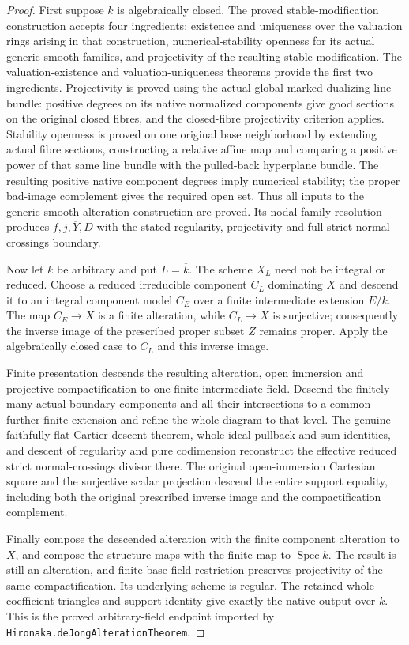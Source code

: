\begin{proof}
First suppose $k$ is algebraically closed. The proved stable-modification
construction accepts four ingredients: existence and uniqueness over the
valuation rings arising in that construction, numerical-stability openness
for its actual generic-smooth families, and projectivity of the resulting
stable modification. The valuation-existence and valuation-uniqueness
theorems provide the first two ingredients. Projectivity is proved using
the actual global marked dualizing line bundle: positive degrees on its
native normalized components give good sections on the original closed
fibres, and the closed-fibre projectivity criterion applies. Stability
openness is proved on one original base neighborhood by extending actual
fibre sections, constructing a relative affine map and comparing a
positive power of that same line bundle with the pulled-back hyperplane
bundle. The resulting positive native component degrees imply numerical
stability; the proper bad-image complement gives the required open set.
Thus all inputs to the generic-smooth alteration construction are proved.
Its nodal-family resolution produces $f,j,\overline Y,D$ with the stated
regularity, projectivity and full strict normal-crossings boundary.

Now let $k$ be arbitrary and put $L=\overline k$. The scheme $X_L$ need
not be integral or reduced. Choose a reduced irreducible component $C_L$
dominating $X$ and descend it to an integral component model $C_E$
over a finite intermediate extension $E/k$. The map $C_E\to X$ is a
finite alteration, while $C_L\to X$ is surjective; consequently the
inverse image of the prescribed proper subset $Z$ remains proper.
Apply the algebraically closed case to $C_L$ and this inverse image.

Finite presentation descends the resulting alteration, open immersion
and projective compactification to one finite intermediate field. Descend
the finitely many actual boundary components and all their intersections
to a common further finite extension and refine the whole diagram to
that level. The genuine faithfully-flat Cartier descent theorem, whole
ideal pullback and sum identities, and descent of regularity and pure
codimension reconstruct the effective reduced strict normal-crossings
divisor there. The original open-immersion Cartesian square and the
surjective scalar projection descend the entire support equality,
including both the original prescribed inverse image and the
compactification complement.

Finally compose the descended alteration with the finite component
alteration to $X$, and compose the structure maps with the finite map to
$\operatorname{Spec}k$. The result is still an alteration, and finite
base-field restriction preserves projectivity of the same
compactification. Its underlying scheme is regular. The retained whole
coefficient triangles and support identity give exactly the native
output over $k$. This is the proved arbitrary-field endpoint imported by
\texttt{Hironaka.deJongAlterationTheorem}.
\end{proof}

